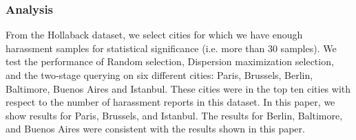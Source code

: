 \documentclass{acm_proc_article-sp}
\begin{document}
\subsubsection{Analysis}
From the Hollaback dataset, we select cities for which we have enough harassment samples for statistical significance (i.e. more than 30 samples). We test the performance of Random selection, Dispersion maximization selection, and the two-stage querying on six different cities: Paris, Brussels, Berlin, Baltimore, Buenos Aires and Istanbul. These cities were in the top ten cities with respect to the number of harassment reports in this dataset. In this paper, we show results for Paris, Brussels, and Istanbul. The results for Berlin, Baltimore, and Buenos Aires were consistent with the results shown in this paper. \par
\end{document}
